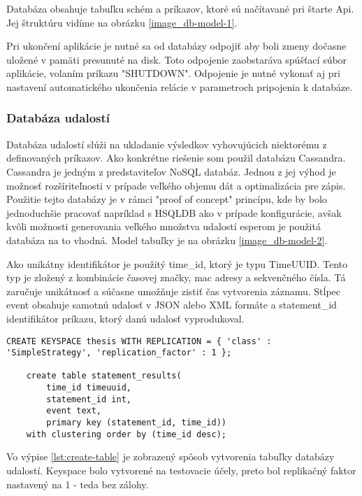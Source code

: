 		Databáza obsahuje tabuľku schém a príkazov, ktoré sú načítavané pri štarte Api. Jej štruktúru vidíme na obrázku \ref{image_db-model-1}.
		
		Pri ukončení aplikácie je nutné sa od databázy odpojiť aby boli zmeny dočasne uložené v pamäti presunuté na disk. Toto odpojenie zaobstaráva spúšťací súbor aplikácie, volaním príkazu "SHUTDOWN". Odpojenie je nutné vykonať aj pri nastavení automatického ukončenia relácie v parametroch pripojenia k databáze.
			
		\subsubsection{Databáza udalostí}
		Databáza udalostí slúži na ukladanie výsledkov vyhovujúcich niektorému z definovaných príkazov. Ako konkrétne riešenie som použil databázu Cassandra. Cassandra je jedným z predstaviteľov NoSQL databáz. Jednou z jej výhod je možnosť rozšíriteľnosti v prípade veľkého objemu dát a optimalizácia pre zápis. Použitie tejto databázy je v rámci "proof of concept" princípu, kde by bolo jednoduchšie pracovať napríklad s HSQLDB ako v prípade konfigurácie, avšak kvôli možnosti generovania veľkého množstva udalostí esperom je použitá databáza na to vhodná. Model tabuľky je na obrázku \ref{image_db-model-2}.

		Ako unikátny identifikátor je použitý time\_id, ktorý je typu TimeUUID. Tento typ je zložený z kombinácie časovej značky, mac adresy a sekvenčného čísla. Tá zaručuje unikátnosť a súčasne umožňuje zistiť čas vytvorenia záznamu. Stĺpec event obsahuje samotnú udalosť v JSON alebo XML formáte a statement\_id identifikátor príkazu, ktorý danú udalosť vyprodukoval.
	
		\begin{lstlisting}[label=lst:create-table,caption=Vytvorenie keyspace a tabuľky databázy udalostí]
	CREATE KEYSPACE thesis WITH REPLICATION = { 'class' : 'SimpleStrategy', 'replication_factor' : 1 };

	create table statement_results(
		time_id timeuuid,
		statement_id int,
		event text,
		primary key (statement_id, time_id))
	with clustering order by (time_id desc);
		\end{lstlisting}
		
		Vo výpise \ref{lst:create-table} je zobrazený spôsob vytvorenia tabuľky databázy udalostí. Keyspace bolo vytvorené na testovacie účely, preto bol replikačný faktor nastavený na 1 - teda bez zálohy.
		
